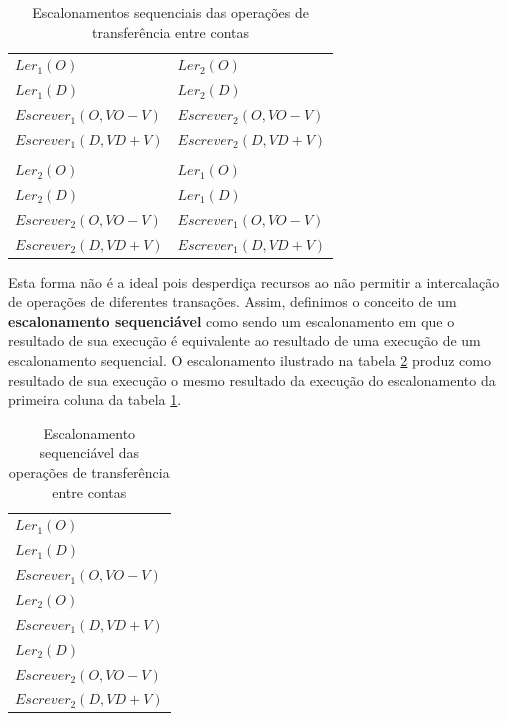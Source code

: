 \documentclass[11pt,twoside,a4paper]{book}
\begin{document}
\begin{table}
\caption{Escalonamentos sequenciais das operações de transferência entre contas}
\label{tab:escalonamento_sequencial}
\centering
\begin{tabular}{ | l | l | }
	\hline
	$Ler_1(O)$&$Ler_2(O)$\\
	$Ler_1(D)$&$Ler_2(D)$\\
	$Escrever_1(O, VO - V)$&$Escrever_2(O, VO - V)$\\
	$Escrever_1(D, VD + V)$&$Escrever_2(D, VD + V)$\\
	&\\
	$Ler_2(O)$&$Ler_1(O)$\\
	$Ler_2(D)$&$Ler_1(D)$\\
	$Escrever_2(O, VO - V)$&$Escrever_1(O, VO - V)$\\
	$Escrever_2(D, VD + V)$&$Escrever_1(D, VD + V)$\\
	\hline
\end{tabular}
\end{table}

Esta forma não é a ideal pois desperdiça recursos ao não permitir a intercalação de operações de diferentes transações. Assim, definimos o conceito de um \textbf{escalonamento sequenciável} como sendo um escalonamento em que o resultado de sua execução é equivalente ao resultado de uma execução de um escalonamento sequencial. O escalonamento ilustrado na tabela \ref{tab:escalonamento_sequenciavel} produz como resultado de sua execução o mesmo resultado da execução do escalonamento da primeira coluna da tabela \ref{tab:escalonamento_sequencial}.

\begin{table}
\caption{Escalonamento sequenciável das operações de transferência entre contas}
\label{tab:escalonamento_sequenciavel}
\centering
\begin{tabular}{ | l | }
	\hline
	$Ler_1(O)$\\
	$Ler_1(D)$\\
	$Escrever_1(O, VO - V)$\\
	$Ler_2(O)$\\
	$Escrever_1(D, VD + V)$\\
	$Ler_2(D)$\\
	$Escrever_2(O, VO - V)$\\
	$Escrever_2(D, VD + V)$\\
	\hline
\end{tabular}
\end{table}
\end{document}
